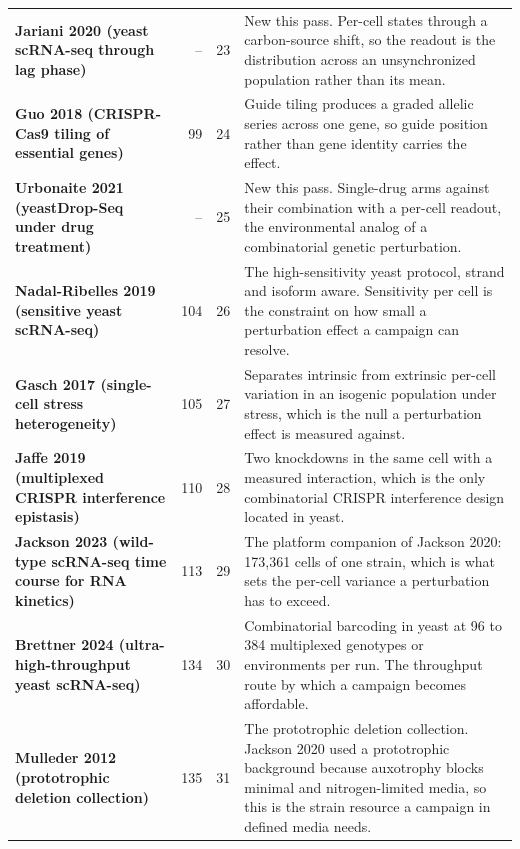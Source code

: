 \begin{longtable}{@{}L{46mm} r@{\hspace{6pt}} r@{\hspace{6pt}} L{104mm}@{}}
\addlinespace[5pt]
\textbf{Jariani 2020 (yeast scRNA-seq through lag phase)} & -- & 23 & New this pass. Per-cell states through a carbon-source shift, so the readout is the distribution across an unsynchronized population rather than its mean. \\
\addlinespace[5pt]
\textbf{Guo 2018 (CRISPR-Cas9 tiling of essential genes)} & 99 & 24 & Guide tiling produces a graded allelic series across one gene, so guide position rather than gene identity carries the effect. \\
\addlinespace[5pt]
\textbf{Urbonaite 2021 (yeastDrop-Seq under drug treatment)} & -- & 25 & New this pass. Single-drug arms against their combination with a per-cell readout, the environmental analog of a combinatorial genetic perturbation. \\
\addlinespace[5pt]
\textbf{Nadal-Ribelles 2019 (sensitive yeast scRNA-seq)} & 104 & 26 & The high-sensitivity yeast protocol, strand and isoform aware. Sensitivity per cell is the constraint on how small a perturbation effect a campaign can resolve. \\
\addlinespace[5pt]
\textbf{Gasch 2017 (single-cell stress heterogeneity)} & 105 & 27 & Separates intrinsic from extrinsic per-cell variation in an isogenic population under stress, which is the null a perturbation effect is measured against. \\
\addlinespace[5pt]
\textbf{Jaffe 2019 (multiplexed CRISPR interference epistasis)} & 110 & 28 & Two knockdowns in the same cell with a measured interaction, which is the only combinatorial CRISPR interference design located in yeast. \\
\addlinespace[5pt]
\textbf{Jackson 2023 (wild-type scRNA-seq time course for RNA kinetics)} & 113 & 29 & The platform companion of Jackson 2020: 173,361 cells of one strain, which is what sets the per-cell variance a perturbation has to exceed. \\
\addlinespace[5pt]
\textbf{Brettner 2024 (ultra-high-throughput yeast scRNA-seq)} & 134 & 30 & Combinatorial barcoding in yeast at 96 to 384 multiplexed genotypes or environments per run. The throughput route by which a campaign becomes affordable. \\
\addlinespace[5pt]
\textbf{Mulleder 2012 (prototrophic deletion collection)} & 135 & 31 & The prototrophic deletion collection. Jackson 2020 used a prototrophic background because auxotrophy blocks minimal and nitrogen-limited media, so this is the strain resource a campaign in defined media needs. \\

\end{longtable}
